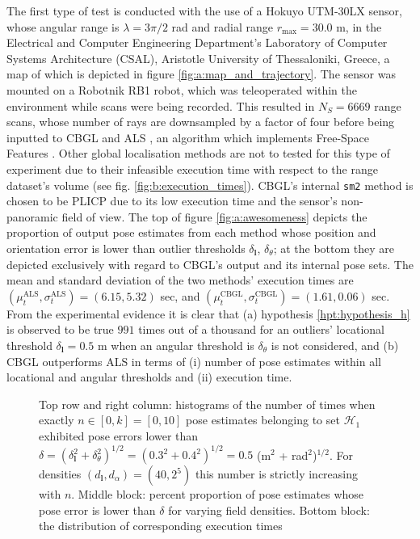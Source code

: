 The first type of test is conducted with the use of a Hokuyo UTM-30LX
sensor, whose angular range is $\lambda = 3\pi/2$ rad and radial range
$r_{\max} = 30.0$ m, in the  Electrical and Computer Engineering Department's
Laboratory of Computer Systems Architecture (CSAL), Aristotle University of
Thessaloniki, Greece, a map of which is depicted in figure
\ref{fig:a:map_and_trajectory}. The sensor was mounted on a Robotnik RB1 robot,
which was teleoperated within the environment while scans were being recorded.
This resulted in $N_{S}=6669$ range scans, whose number of rays are downsampled
by a factor of four before being inputted to CBGL and ALS \cite{als_jp}, an
algorithm which implements Free-Space Features \cite{als_eth}. Other global
localisation methods are not to tested for this type of experiment due to
their infeasible execution time with respect to the range dataset's volume (see
fig. \ref{fig:b:execution_times}). CBGL's internal \texttt{sm2}
method is chosen to be PLICP \cite{Censi2008c} due to its low execution time
and the sensor's non-panoramic field of view. The top of figure
\ref{fig:a:awesomeness} depicts the proportion of output pose estimates from
each method whose position and orientation error is lower than outlier
thresholds $\delta_{\bm{l}}$, $\delta_{\theta}$; at the bottom they are
depicted exclusively with regard to CBGL's output and its internal pose sets.
The mean and standard deviation of the two methods' execution times are
$(\mu_t^{\text{ALS}}, \sigma_t^{\text{ALS}}) = (6.15, 5.32)$ sec, and
$(\mu_t^{\text{CBGL}}, \sigma_t^{\text{CBGL}}) = (1.61, 0.06)$ sec. From the
experimental evidence it is clear that (a) hypothesis \ref{hpt:hypothesis_h} is
observed to be true $991$ times out of a thousand for an outliers' locational
threshold $\delta_{\bm{l}} = 0.5$ m when an angular threshold is
$\delta_{\theta}$ is not considered, and (b) CBGL outperforms ALS in terms of
(i) number of pose estimates within all locational and angular thresholds and
(ii) execution time.

\begin{figure}
  \vspace{-0.3cm}
  
  \vspace{-0.3cm}
  \caption{\small Top row and right column: histograms of the number of times
           when exactly $n \in [0,k] = [0,10]$ pose estimates belonging to set
           $\mathcal{H}_1$ exhibited pose errors lower than $\delta =
           (\delta_{\bm{l}}^2 + \delta_{\theta}^2)^{1/2} =  (0.3^2 +
           0.4^2)^{1/2} = 0.5$ (m$^2$ + rad$^2$)$^{1/2}$. For densities
           $(d_{\bm{l}},d_{\alpha}) = (40, 2^5)$ this number is strictly
           increasing with $n$. Middle block: percent proportion of pose
           estimates whose pose error is lower than $\delta$ for varying field
           densities. Bottom block: the distribution of corresponding execution
           times}
  \vspace{-0.5cm}
  \label{fig:a:determine_40_32}
\end{figure}


